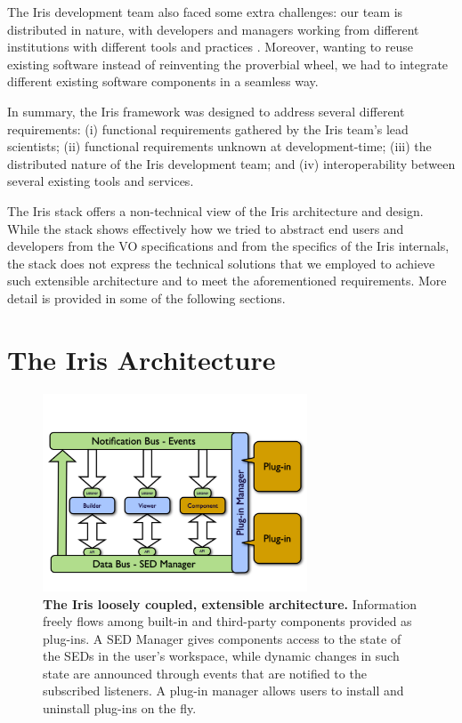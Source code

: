 \documentclass[preprint,authoryear,5p]{elsarticle}
\begin{document}
The Iris development team also faced some extra challenges: our team is
distributed in nature, with developers and managers working from different
institutions with different tools and practices \citep{2012SPIE.8449E..0IE}.
Moreover, wanting to reuse existing software instead of reinventing the
proverbial wheel, we had to integrate different existing software components in
a seamless way.

In summary, the Iris framework was designed to address several different
requirements: (i) functional requirements gathered by the Iris team's lead
scientists; (ii) functional requirements unknown at development-time; (iii) the
distributed nature of the Iris development team; and (iv) interoperability between 
several existing tools and services.

The Iris stack offers a non-technical view of the Iris architecture and design.
While the stack shows effectively how we tried to abstract end users and developers
from the VO specifications and from the specifics of the Iris internals, the stack does
not express the technical solutions that we employed to achieve such extensible
architecture and to meet the aforementioned requirements. More detail is
provided in some of the following sections.

\section{The Iris Architecture} \label{sec:architecture}

\begin{figure} \begin{center}
\includegraphics[width=0.7\textwidth]{IrisDiagrams.001.pdf}
\caption{\textbf{The Iris loosely coupled, extensible architecture.}  Information
freely flows among built-in and third-party components provided as plug-ins. A
SED Manager gives components access to the state of the SEDs in the user's
workspace, while dynamic changes in such state are announced through events that
are notified to the subscribed listeners. A plug-in manager allows users to
install and uninstall plug-ins on the fly.} \label{fig:architecture}
\end{center} \end{figure}
\end{document}
